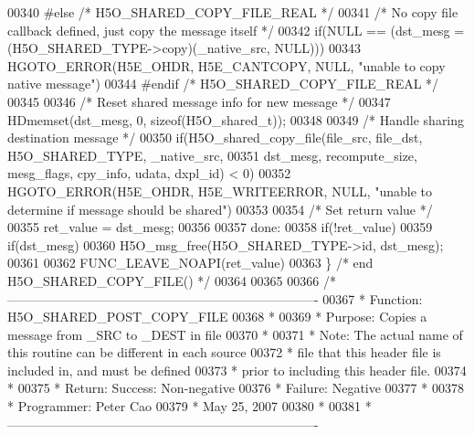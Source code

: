 \begin{DoxyCode}
00340 \textcolor{preprocessor}{#else }\textcolor{comment}{/* H5O\_SHARED\_COPY\_FILE\_REAL */}\textcolor{preprocessor}{}
00341     \textcolor{comment}{/* No copy file callback defined, just copy the message itself */}
00342     \textcolor{keywordflow}{if}(NULL == (dst\_mesg = (H5O\_SHARED\_TYPE->copy)(\_native\_src, NULL)))
00343         HGOTO\_ERROR(H5E\_OHDR, H5E\_CANTCOPY, NULL, \textcolor{stringliteral}{"unable to copy native message"})
00344 \textcolor{preprocessor}{#endif }\textcolor{comment}{/* H5O\_SHARED\_COPY\_FILE\_REAL */}\textcolor{preprocessor}{}
00345 
00346     \textcolor{comment}{/* Reset shared message info for new message */}
00347     HDmemset(dst\_mesg, 0, \textcolor{keyword}{sizeof}(H5O\_shared\_t));
00348 
00349     \textcolor{comment}{/* Handle sharing destination message */}
00350     \textcolor{keywordflow}{if}(H5O\_shared\_copy\_file(file\_src, file\_dst, H5O\_SHARED\_TYPE, \_native\_src,
00351             dst\_mesg, recompute\_size, mesg\_flags, cpy\_info, udata, dxpl\_id) < 0)
00352         HGOTO\_ERROR(H5E\_OHDR, H5E\_WRITEERROR, NULL, \textcolor{stringliteral}{"unable to determine if message should be shared"})
00353 
00354     \textcolor{comment}{/* Set return value */}
00355     ret\_value = dst\_mesg;
00356 
00357 done:
00358     if(!ret\_value)
00359         if(dst\_mesg)
00360             H5O\_msg\_free(H5O\_SHARED\_TYPE->\textcolor{keywordtype}{id}, dst\_mesg);
00361 
00362     FUNC\_LEAVE\_NOAPI(ret\_value)
00363 \} \textcolor{comment}{/* end H5O\_SHARED\_COPY\_FILE() */}
00364 
00365 
00366 \textcolor{comment}{/*-------------------------------------------------------------------------}
00367 \textcolor{comment}{ * Function:    H5O\_SHARED\_POST\_COPY\_FILE}
00368 \textcolor{comment}{ *}
00369 \textcolor{comment}{ * Purpose:     Copies a message from \_SRC to \_DEST in file}
00370 \textcolor{comment}{ *}
00371 \textcolor{comment}{ * Note:        The actual name of this routine can be different in each source}
00372 \textcolor{comment}{ *              file that this header file is included in, and must be defined}
00373 \textcolor{comment}{ *              prior to including this header file.}
00374 \textcolor{comment}{ *}
00375 \textcolor{comment}{ * Return:      Success:        Non-negative}
00376 \textcolor{comment}{ *              Failure:        Negative}
00377 \textcolor{comment}{ *}
00378 \textcolor{comment}{ * Programmer:  Peter Cao}
00379 \textcolor{comment}{ *              May 25, 2007}
00380 \textcolor{comment}{ *}
00381 \textcolor{comment}{ *-------------------------------------------------------------------------}

\end{DoxyCode}
